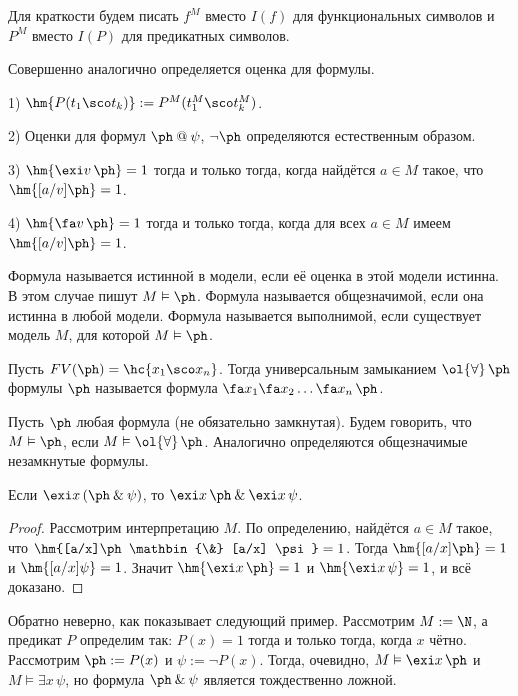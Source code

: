 \documentclass[a4paper,draft]{article}
\makeatletter
\let\amper\&
\def\&{\mathbin{\amper}}
\def\atm{\mathbin{@}}
\def\ufa{\ol{\forall}\,}
\def\exis#1{\exi#1\,}
\makeatother
\begin{document}
Для краткости будем писать $f^M$ вместо $I(f)$ для функциональных символов и $P^M$ вместо $I(P)$ для предикатных символов.

\begin{df}
  Совершенно аналогично определяется оценка для формулы.

  1) $\hm{P(t_1\sco t_k)} := P^M(t_1^M\sco t_k^M)$.

  2) Оценки для формул $\ph \atm \psi$, $\neg \ph$  определяются естественным образом.

  3) $\hm{\exi v\,\ph} = 1$ тогда и только тогда, когда найдётся $a \in M$ такое, что $\hm{[a/v]\ph} = 1$.

  4) $\hm{\fa v\,\ph} = 1$ тогда и только тогда, когда для всех $a \in M$ имеем $\hm{[a/v]\ph} = 1$.
\end{df}

\begin{df}
  Формула называется истинной в модели, если её оценка в этой модели истинна.
  В этом случае пишут $M \vDash \ph$. Формула называется общезначимой, если она истинна в любой
  модели. Формула называется выполнимой, если существует модель $M$, для которой $M \vDash \ph$.
\end{df}

\begin{df}
  Пусть $FV(\ph) = \hc{x_1\sco x_n}$. Тогда универсальным замыканием $\ufa\ph$ формулы $\ph$ называется формула
  $\fa x_1\fa x_2\ldots\fa x_n\,\ph$.
\end{df}

\begin{df}
  Пусть $\ph$ любая формула (не обязательно замкнутая). Будем говорить, что $M \vDash\ph$, если $M \vDash \ufa\ph$.
  Аналогично определяются общезначимые незамкнутые формулы.
\end{df}


\begin{lemma}
  Если $\exis{x}(\ph \& \psi)$, то $\exis{x}\ph \& \exis{x}\psi$.
\end{lemma}
\begin{proof}
  Рассмотрим интерпретацию $M$. По определению, найдётся $a \in M$ такое, что
  $\hm{[a/x]\ph \& [a/x] \psi} = 1$. Тогда $\hm{[a/x]\ph} = 1$ и $\hm{[a/x]\psi} = 1$.
  Значит $\hm{\exis{x}\ph} = 1$ и $\hm{\exis{x}\psi} = 1$, и всё доказано.
\end{proof}

\begin{ex}
  Обратно неверно, как показывает следующий  пример. Рассмотрим $M := \N$, а предикат $P$ определим так:
  $P(x) = 1$ тогда и только тогда, когда $x$ чётно. Рассмотрим $\ph := P(x)$ и $\psi := \neg P(x)$.
  Тогда, очевидно, $M \vDash \exis{x} \ph$ и $M \vDash \exis{x} \psi$, но формула $\ph \& \psi$ является тождественно ложной.
\end{ex}
\end{document}
